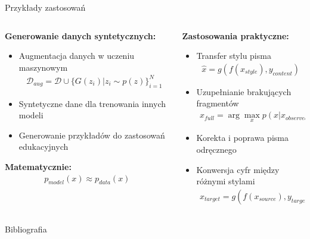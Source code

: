 \documentclass{beamer}
\begin{document}
\begin{frame}{Przykłady zastosowań}
  \begin{columns}
    \begin{column}{0.5\textwidth}
    \textbf{Generowanie danych syntetycznych:}
    \begin{itemize}
    \item Augmentacja danych w uczeniu maszynowym
    \begin{align*}
    \mathcal{D}_{aug} = \mathcal{D} \cup \{G(z_i) | z_i \sim p(z)\}_{i=1}^N
    \end{align*}
    \item Syntetyczne dane dla trenowania innych modeli
    \item Generowanie przykładów do zastosowań edukacyjnych
    \end{itemize}
    
    \textbf{Matematycznie:}
    \begin{align*}
    p_{model}(x) \approx p_{data}(x)
    \end{align*}
    \end{column}
    \begin{column}{0.5\textwidth}
    \textbf{Zastosowania praktyczne:}
    \begin{itemize}
    \item Transfer stylu pisma
    \begin{align*}
    \hat{x} = g(f(x_{style}), y_{content})
    \end{align*}
    \item Uzupełnianie brakujących fragmentów
    \begin{align*}
    \hat{x}_{full} = \arg\max_x p(x | x_{observed})
    \end{align*}
    \item Korekta i poprawa pisma odręcznego
    \item Konwersja cyfr między różnymi stylami
    \begin{align*}
    x_{target} = g(f(x_{source}), y_{target})
    \end{align*}
    \end{itemize}
    \end{column}
  \end{columns}
\end{frame}


\begin{frame}[allowframebreaks]{Bibliografia}
  \printbibliography
\end{frame}
\end{document}
